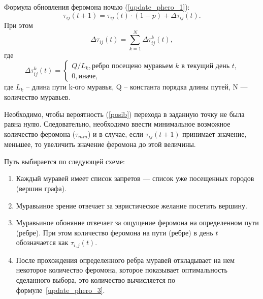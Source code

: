 Формула обновления феромона ночью (\eqref{update_phero_1}):
\begin{equation}
	\label{update_phero_1}
	\tau_{ij}(t+1) = \tau_{ij}(t)\cdot(1-p) + \Delta \tau_{ij}(t).
\end{equation}
При этом
\begin{equation}
	\label{update_phero_2}
	\Delta \tau_{ij}(t) = \sum_{k=1}^N \Delta \tau^k_{ij}(t),
\end{equation}
где
\begin{equation}
	\label{update_phero_3}
	\Delta\tau^k_{ij}(t) = \begin{cases}
		Q/L_{k}, \textrm{ребро посещено муравьем $k$ в текущий день $t$,} \\
		0, \textrm{иначе},
	\end{cases}
\end{equation}
где $L_{k}$ -- длина пути k-ого муравья, Q -- константа порядка длины путей, N — количество муравьев.

Необходимо, чтобы вероятность (\ref{posib}) перехода в заданную точку не была равна нулю. 
Следовательно, необходимо ввести минимальное возможное количество феромона ($\tau_{min}$) и в случае, если $\tau_{ij} (t+1)$ принимает значение, меньшее, то увеличить значение феромона до этой величины.

Путь выбирается по следующей схеме:
\begin{enumerate}
	\item Каждый муравей имеет список запретов --- список уже посещенных городов (вершин графа).
	\item Муравьиное зрение отвечает за эвристическое желание посетить вершину.
	\item Муравьиное обоняние отвечает за ощущение феромона на определенном пути (ребре). При этом количество феромона на пути (ребре) в день $t$ обозначается как $\tau_{i, j} (t)$.
	\item После прохождения определенного ребра муравей откладывает на нем некоторое количество феромона, которое показывает оптимальность сделанного выбора, это количество вычисляется по формуле~\eqref{update_phero_3}.
\end{enumerate}
